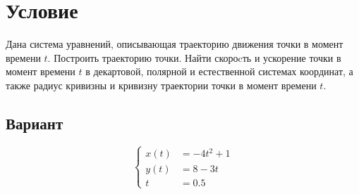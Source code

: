 \section{Условие}
Дана система уравнений, описывающая траекторию движения точки в момент времени $t$.
Построить траекторию точки. Найти скороcть и ускорение точки в момент времени $t$ в
декартовой, полярной и естественной системах координат, а также радиус кривизны и
кривизну траектории точки в момент времени $t$.

\subsection{Вариант}

$$
\begin{cases}
x(t) &= -4t^{2} + 1 \\
y(t) &= 8 - 3t \\
t &= 0.5
\end{cases}
$$
